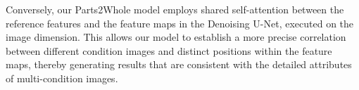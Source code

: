 Conversely, our Parts2Whole model employs shared self-attention between the reference features and the feature maps in the Denoising U-Net, executed on the image dimension. This allows our model to establish a more precise correlation between different condition images and distinct positions within the feature maps, thereby generating results that are consistent with the detailed attributes of multi-condition images.

